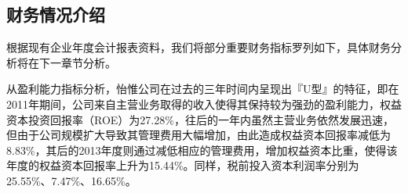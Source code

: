 
\subsection{财务情况介绍}
根据现有企业年度会计报表资料，我们将部分重要财务指标罗列如下，具体财务分析将在下一章节分析。

从盈利能力指标分析，怡惟公司在过去的三年时间内呈现出『U型』的特征，即在2011年期间，公司来自主营业务取得的收入使得其保持较为强劲的盈利能力，权益资本投资回报率（ROE）为27.28\%，往后的一年内虽然主营业务依然发展迅速，但由于公司规模扩大导致其管理费用大幅增加，由此造成权益资本回报率减低为8.83\%，其后的2013年度则通过减低相应的管理费用，增加权益资本比重，使得该年度的权益资本回报率上升为15.44\%。同样，税前投入资本利润率分别为25.55\%、7.47\%、16.65\%。

